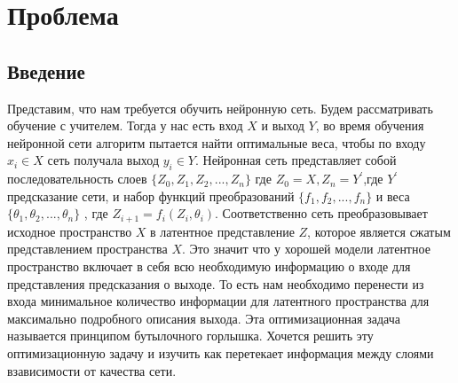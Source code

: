 \section{Проблема}

\subsection{Введение}
Представим, что нам требуется обучить нейронную сеть. Будем рассматривать обучение с учителем. Тогда у нас есть вход $X$ и выход $Y$, во время обучения нейронной сети алгоритм пытается найти оптимальные веса, чтобы по входу $x_i \in X$ сеть получала выход $y_i \in Y$.  Нейронная сеть представляет собой последовательность слоев $\{Z_0, Z_1, Z_2, ..., Z_n\}$ где $Z_0 = X, Z_n = Y^'$,где $Y^'$ предсказание сети, и набор функций преобразований $\{f_1, f_2, ..., f_n\}$ и веса $\{\theta_1, \theta_2, ..., \theta_n\}$ , где $Z_{i+1}= f_i(Z_i, \theta_i)$. Соответственно сеть преобразовывает исходное пространство $X$ в латентное представление $Z$, которое является сжатым представлением пространства $X$. Это значит что у хорошей модели латентное пространство включает в себя всю необходимую информацию о входе для представления предсказания о выходе. То есть нам необходимо перенести из входа минимальное количество информации для латентного пространства для максимально подробного описания выхода. Эта оптимизационная задача называется принципом бутылочного горлышка. Хочется решить эту оптимизационную задачу и изучить как перетекает информация между слоями взависимости от качества сети.

